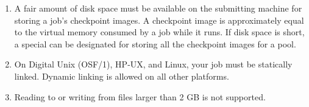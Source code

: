 \begin{enumerate}
\item A fair amount of disk space must be available on the submitting machine
for storing a job's checkpoint images.  A checkpoint image is approximately
equal to the virtual memory consumed by a job while it runs.  If disk space
is short, a special  can be designated for storing
all the checkpoint images for a pool.

\item On Digital Unix (OSF/1), HP-UX, and Linux, your job must be
statically linked. Dynamic linking is allowed on all other platforms.

\item Reading to or writing from files larger than 2 GB is not supported.

\end{enumerate}
